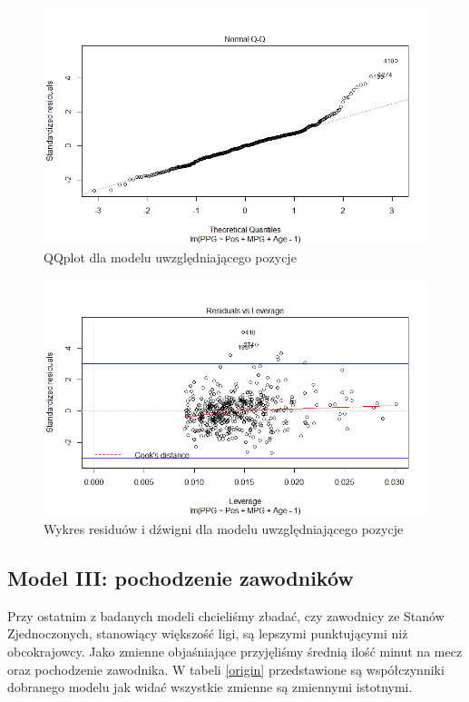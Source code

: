 \documentclass[11pt,a4paper]{article}
\begin{document}
\begin{figure}[t]
	\includegraphics[width=\textwidth]{position_2}
	\caption{QQplot dla modelu uwzględniającego pozycje}
	\label{qqplot_position}
	\centering
\end{figure}
\begin{figure}[t]
	\includegraphics[width=\textwidth]{position_4}
	\caption{Wykres residuów i dźwigni dla modelu uwzględniającego pozycje}
	\label{leverage_position}
	\centering
\end{figure}

\subsection{Model III: pochodzenie zawodników}
Przy ostatnim z badanych modeli chcieliśmy zbadać, czy zawodnicy ze Stanów Zjednoczonych, stanowiący większość ligi, są lepszymi punktującymi niż obcokrajowcy.
Jako zmienne objaśniające przyjęliśmy średnią ilość minut na mecz oraz pochodzenie zawodnika. W tabeli \ref{origin} przedstawione są współczynniki dobranego modelu jak widać wszystkie zmienne są zmiennymi istotnymi.
\end{document}
